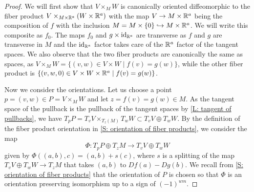 \begin{proof}
	We will first show that $V \times_M W$ is canonically oriented diffeomorphic to the fiber product $V\times_{M \times \mathbb{R}^a } (W \times \mathbb{R}^a )$ with the map $V \to M \times \mathbb{R}^a $ being the composition of $f$ with the inclusion $M = M \times \{0\} \hookrightarrow M \times \mathbb{R}^a $.
	We will write this composite as $f_0$.
	The maps $f_0$ and $g \times \mathrm{id}_{\mathbb{R}^a }$ are transverse as $f$ and $g$ are transverse in $M$ and the $\mathrm{id}_{\mathbb{R}^a }$ factor takes care of the $\mathbb{R}^a $ factor of the tangent spaces.
	We also observe that the two fiber products are canonically the same as spaces, as $V \times_M W = \{(v,w) \in V \times W \mid f(v) = g(w)\}$, while the other fiber product is $\{(v,w,0) \in V \times W \times \mathbb{R}^a \mid f(v) = g(w)\}$.

	Now we consider the orientations.
	Let us choose a point $p = (v,w) \in P = V \times_M W$ and let $z=f(v)=g(w)\in M$.
	As the tangent space of the pullback is the pullback of the tangent spaces by \cref{L: tangent of pullbacks}, we have $T_pP = T_vV \times_{T_z(M)} T_wW \subset T_vV \oplus T_wW$.
	By the definition of the fiber product orientation in \cref{S: orientation of fiber products}, we consider the map
	\begin{equation*}
		\Phi \colon T_pP \oplus T_zM \to T_vV \oplus T_wW
	\end{equation*}
	given by $\Phi((a,b),c) =(a,b)+s(c)$, where $s$ is a splitting of the map $T_vV \oplus T_wW \to T_zM$ that takes $(a,b)$ to $Df(a)-Dg(b)$.
	We recall from \cref{S: orientation of fiber products} that the orientation of $P$ is chosen so that $\Phi$ is an orientation preserving isomorphism up to a sign of $(-1)^{wm}$.


\end{proof}
